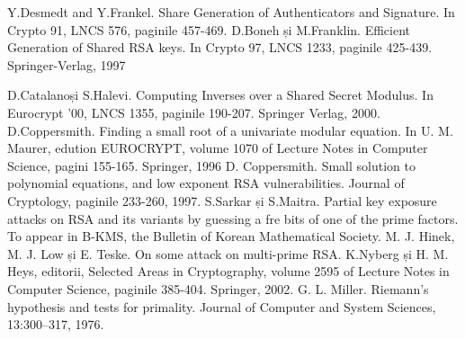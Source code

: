 \documentclass[12]{report}
\begin{document}
\medskip


\begin{thebibliography}{9}
Y.Desmedt and Y.Frankel. Share Generation of Authenticators and Signature. In Crypto 91, LNCS 576, paginile 457-469.
D.Boneh și M.Franklin. Efficient Generation of Shared RSA keys. In Crypto 97, LNCS 1233, paginile 425-439. Springer-Verlag, 1997

D.Catalanoși S.Halevi. Computing Inverses over a Shared Secret Modulus. In Eurocrypt '00, LNCS 1355, paginile 190-207. Springer Verlag, 2000.
D.Coppersmith. Finding a small root of a univariate modular equation. In U. M. Maurer, edution EUROCRYPT, volume 1070 of Lecture Notes in Computer Science, pagini 155-165. Springer, 1996
D. Coppersmith. Small solution to polynomial equations, and low exponent RSA vulnerabilities. Journal of Cryptology, paginile 233-260, 1997.
S.Sarkar și S.Maitra. Partial key exposure attacks on RSA and its variants by guessing a fre bits of one of the prime factors. To appear in B-KMS, the Bulletin of Korean Mathematical Society.
M. J. Hinek, M. J. Low și E. Teske. On some attack on multi-prime RSA. K.Nyberg și H. M. Heys, editorii, Selected Areas in Cryptography, volume 2595 of Lecture Notes in Computer Science, paginile 385-404. Springer, 2002.
G. L. Miller. Riemann’s hypothesis and tests for primality. Journal of Computer and System Sciences, 13:300–317, 1976. 
\end{thebibliography}
\end{document}
